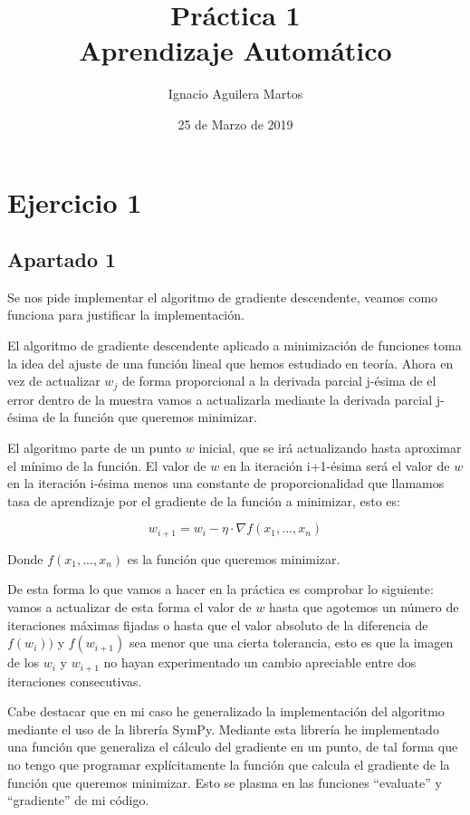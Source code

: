 \documentclass[12pt,a4paper]{article}
\author{Ignacio Aguilera Martos}
\title{Práctica 1 \\ Aprendizaje Automático}
\date{25 de Marzo de 2019}
\begin{document}
	\maketitle

	\tableofcontents

	\newpage

\section{Ejercicio 1}

\subsection{Apartado 1}

Se nos pide implementar el algoritmo de gradiente descendente, veamos como funciona para justificar la implementación.

El algoritmo de gradiente descendente aplicado a minimización de funciones toma la idea del ajuste de una función lineal que hemos estudiado en teoría. Ahora en vez de actualizar $w_j$ de forma proporcional a la derivada parcial j-ésima de el error dentro de la muestra vamos a actualizarla mediante la derivada parcial j-ésima de la función que queremos minimizar.

El algoritmo parte de un punto $w$ inicial, que se irá actualizando hasta aproximar el mínimo de la función. El valor de $w$ en la iteración i+1-ésima será el valor de $w$ en la iteración i-ésima menos una constante de proporcionalidad que llamamos tasa de aprendizaje por el gradiente de la función a minimizar, esto es:

$$w_{i+1} = w_i - \eta \cdot \nabla f(x_1,...,x_n)$$

Donde $f(x_1,...,x_n)$ es la función que queremos minimizar.

De esta forma lo que vamos a hacer en la práctica es comprobar lo siguiente: vamos a actualizar de esta forma el valor de $w$ hasta que agotemos un número de iteraciones máximas fijadas o hasta que el valor absoluto de la diferencia de $f(w_i))$ y $f(w_{i+1})$ sea menor que una cierta tolerancia, esto es que la imagen de los $w_i$ y $w_{i+1}$ no hayan experimentado un cambio apreciable entre dos iteraciones consecutivas.

Cabe destacar que en mi caso he generalizado la implementación del algoritmo mediante el uso de la librería SymPy. Mediante esta librería he implementado una función que generaliza el cálculo del gradiente en un punto, de tal forma que no tengo que programar explícitamente la función que calcula el gradiente de la función que queremos minimizar. Esto se plasma en las funciones ``evaluate'' y ``gradiente'' de mi código.
\end{document}
